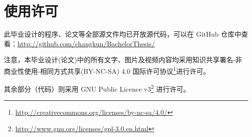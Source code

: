 
\appendix
\chapter{使用许可}

此毕业设计的程序、论文等全部源文件均已开放源代码，可以在 GitHub 仓库中查看：\url{http://github.com/changkun/BachelorThesis/}

注意，本毕业设计(论文)中的所有文字、图片及视频内容均采用知识共享署名-非商业性使用-相同方式共享(BY-NC-SA) 4.0 国际许可协议\footnote{\url{http://creativecommons.org/licenses/by-nc-sa/4.0/}}进行许可。

其余部分（代码）则采用 GNU Public Licence v3\footnote{\url{http://www.gnu.org/licenses/gpl-3.0.en.html}} 进行许可。
